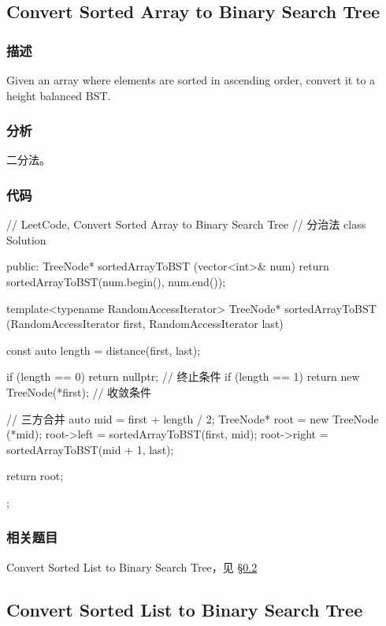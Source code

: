 \subsection{Convert Sorted Array to Binary Search Tree}
\label{sec:convert-sorted-array-to-binary-search-tree}


\subsubsection{描述}
Given an array where elements are sorted in ascending order, convert it to a height balanced BST.


\subsubsection{分析}
二分法。


\subsubsection{代码}

\begin{Code}
// LeetCode, Convert Sorted Array to Binary Search Tree
// 分治法
class Solution {
public:
    TreeNode* sortedArrayToBST (vector<int>& num) {
        return sortedArrayToBST(num.begin(), num.end());
    }

    template<typename RandomAccessIterator>
    TreeNode* sortedArrayToBST (RandomAccessIterator first,
            RandomAccessIterator last) {
        const auto length = distance(first, last);

        if (length == 0) return nullptr;  // 终止条件
        if (length == 1) return new TreeNode(*first); // 收敛条件

        // 三方合并
        auto mid = first + length / 2;
        TreeNode* root = new TreeNode (*mid);
        root->left = sortedArrayToBST(first, mid);
        root->right = sortedArrayToBST(mid + 1, last);

        return root;
    }
};
\end{Code}


\subsubsection{相关题目}
\begindot
\item Convert Sorted List to Binary Search Tree，见 \S \ref{sec:convert-sorted-list-to-binary-search-tree}
\myenddot


\subsection{Convert Sorted List to Binary Search Tree}
\label{sec:convert-sorted-list-to-binary-search-tree}


